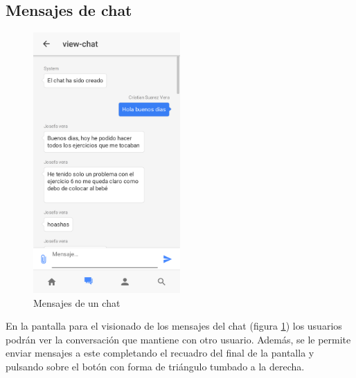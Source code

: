 \subsection{Mensajes de chat}
\begin{figure}[!h]
    \centering
    \includegraphics[width=0.5\textwidth]{images/screenshots/Vista-chat.png}
    \caption{Mensajes de un chat}
    \label{mensajes-chat}
\end{figure}

En la pantalla para el visionado de los mensajes del chat
(figura \ref{mensajes-chat}) los usuarios podrán ver la conversación que
mantiene con otro usuario. Además, se le permite enviar mensajes a este
completando el recuadro del final de la pantalla y pulsando sobre el botón
con forma de triángulo tumbado a la derecha.

